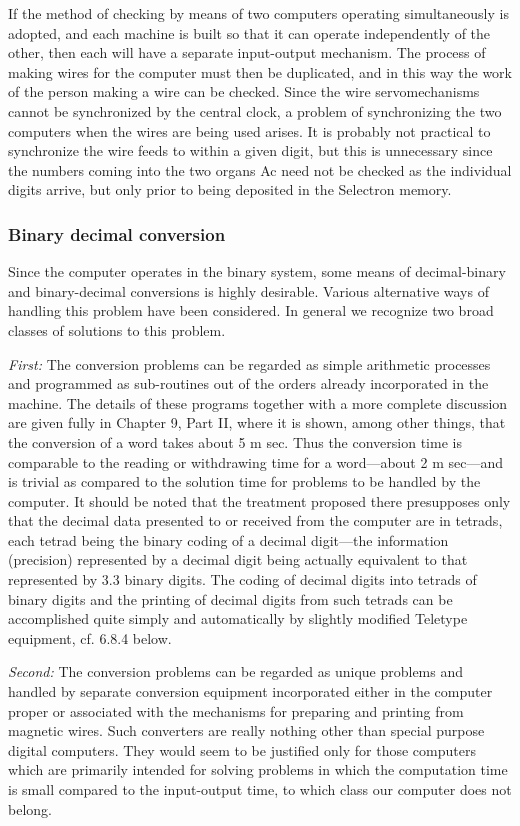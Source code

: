 \documentclass[12pt]{amsart}
\begin{document}
If the method of checking by means of two computers operating simultaneously is adopted, and each machine is built so that it can operate independently of the other, then each will have a separate input-output mechanism. The process of making wires for the computer must then be duplicated, and in this way the work of the person making a wire can be checked. Since the wire servomechanisms cannot be synchronized by the central clock, a problem of synchronizing the two computers when the wires are being used arises. It is probably not practical to synchronize the wire feeds to within a given digit, but this is unnecessary since the numbers coming into the two organs Ac need not be checked as the individual digits arrive, but only prior to being deposited in the Selectron memory.

\subsubsection{Binary decimal conversion}
Since the computer operates in the binary system, some means of decimal-binary and binary-decimal conversions is highly desirable. Various alternative ways of handling this problem have been considered. In general we recognize two broad classes of solutions to this problem.

\emph{First:} The conversion problems can be regarded as simple arithmetic processes and programmed as sub-routines out of the orders already incorporated in the machine. The details of these programs together with a more complete discussion are given fully in Chapter 9, Part II, where it is shown, among other things, that the conversion of a word takes about 5 m sec. Thus the conversion time is comparable to the reading or withdrawing time for a word---about 2 m sec---and is trivial as compared to the solution time for problems to be handled by the computer. It should be noted that the treatment proposed there presupposes only that the decimal data presented to or received from the computer are in tetrads, each tetrad being the binary coding of a decimal digit---the information (precision) represented by a decimal digit being actually equivalent to that represented by 3.3 binary digits. The coding of decimal digits into tetrads of binary digits and the printing of decimal digits from such tetrads can be accomplished quite simply and automatically by slightly modified Teletype equipment, cf. 6.8.4 below.

\emph{Second:} The conversion problems can be regarded as unique problems and handled by separate conversion equipment incorporated either in the computer proper or associated with the mechanisms for preparing and printing from magnetic wires. Such converters are really nothing other than special purpose digital computers. They would seem to be justified only for those computers which are primarily intended for solving problems in which the computation time is small compared to the input-output time, to which class our computer does not belong.
\end{document}
